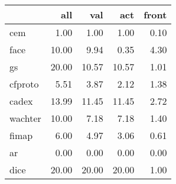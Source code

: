 \begin{tabular}{lrrrr}
\hline
{} &    all &    val &    act &  front \\ \hline
\hline
cem                 &   1.00 &   1.00 &   1.00 &   0.10 \\ \hline
face                &  10.00 &   9.94 &   0.35 &   4.30 \\ \hline
gs     &  20.00 &  10.57 &  10.57 &   1.01 \\ \hline
cfproto             &   5.51 &   3.87 &   2.12 &   1.38 \\ \hline
cadex               &  13.99 &  11.45 &  11.45 &   2.72 \\ \hline
wachter             &  10.00 &   7.18 &   7.18 &   1.40 \\ \hline
fimap               &   6.00 &   4.97 &   3.06 &   0.61 \\ \hline
ar &   0.00 &   0.00 &   0.00 &   0.00 \\ \hline
dice                &  20.00 &  20.00 &  20.00 &   1.00 \\ \hline
\hline
\end{tabular}
